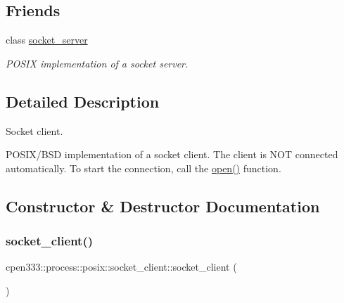 \subsection*{Friends}
\begin{DoxyCompactItemize}
\item 
class \hyperlink{classcpen333_1_1process_1_1posix_1_1socket__client_aba37c0ea463da9263b0712d3b3389066}{socket\+\_\+server}
\begin{DoxyCompactList}\small\item\em P\+O\+S\+IX implementation of a socket server. \end{DoxyCompactList}\end{DoxyCompactItemize}


\subsection{Detailed Description}
Socket client. 

P\+O\+S\+I\+X/\+B\+SD implementation of a socket client. The client is N\+OT connected automatically. To start the connection, call the \hyperlink{classcpen333_1_1process_1_1posix_1_1socket__client_ad97e32714907d8c4566605926f718d88}{open()} function. 

\subsection{Constructor \& Destructor Documentation}
\mbox{\label{classcpen333_1_1process_1_1posix_1_1socket__client_ad64689be09343aa92a4891cec8091e2a}} 
\subsubsection{\texorpdfstring{socket\+\_\+client()}{socket\_client()}\hspace{0.1cm}{\footnotesize\ttfamily [1/2]}}
{\footnotesize\ttfamily cpen333\+::process\+::posix\+::socket\+\_\+client\+::socket\+\_\+client (\begin{DoxyParamCaption}{ }\end{DoxyParamCaption})\hspace{0.3cm}{\ttfamily [inline]}}



